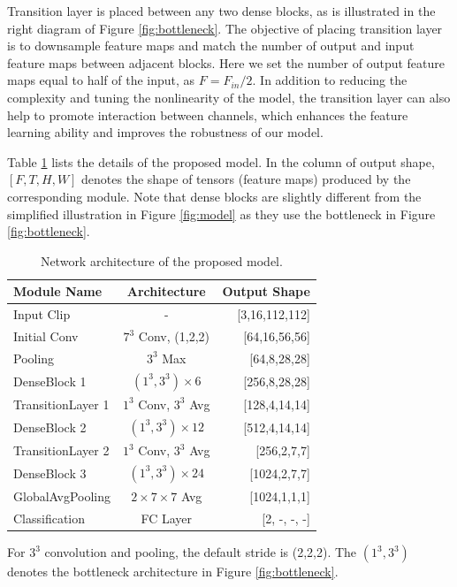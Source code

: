 \documentclass[10pt,twocolumn,letterpaper]{article}
\begin{document}
Transition layer is placed between any two dense blocks, as is illustrated in the right diagram of Figure \ref{fig:bottleneck}.
The objective of placing transition layer is to downsample feature maps and match the number of output and input feature maps between adjacent blocks.
Here we set the number of output feature maps equal to half of the input, as $F = F_{in}/2$.
In addition to reducing the complexity and tuning the nonlinearity of the model, the transition layer can also help to promote interaction between channels, which enhances the feature learning ability and improves the robustness of our model.

Table \ref{table:arch} lists the details of the proposed model.
In the column of output shape, $[F, T, H, W]$ denotes the shape of tensors (feature maps) produced by the corresponding module.
Note that dense blocks are slightly different from the simplified illustration in Figure \ref{fig:model} as they use the bottleneck in Figure \ref{fig:bottleneck}. 


\begin{table}[t]
\begin{center}
\caption{Network architecture of the proposed model.}
\label{table:arch}
\begin{tabular}{lcr}
\hline
\textbf{Module Name} & \textbf{Architecture} & \textbf{Output Shape} \\
\hline\hline
Input Clip & - & [3,16,112,112] \\
Initial Conv & $7^3$ Conv, (1,2,2) & [64,16,56,56] \\
Pooling & $3^3$ Max & [64,8,28,28] \\
DenseBlock 1 & $(1^3, 3^3) \times 6$ & [256,8,28,28] \\
TransitionLayer 1 & $1^3$ Conv, $3^3$ Avg & [128,4,14,14]\\
DenseBlock 2 & $(1^3, 3^3) \times 12$ & [512,4,14,14] \\
TransitionLayer 2 & $1^3$ Conv, $3^3$ Avg & [256,2,7,7] \\
DenseBlock 3 & $(1^3, 3^3) \times 24$ & [1024,2,7,7]\\
GlobalAvgPooling & $2 \times 7 \times 7$ Avg & [1024,1,1,1]\\
Classification & FC Layer & [2, -, -, -] \\
\hline
\end{tabular}
\end{center}
\footnotesize
For $3^3$ convolution and pooling, the default stride is (2,2,2). The $(1^3, 3^3)$ denotes the bottleneck architecture in Figure \ref{fig:bottleneck}.
\end{table}
\end{document}
